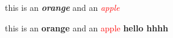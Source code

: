 \documentclass{article}
\newcommand\jh[1]{\textbf{\itshape #1}}
\newcommand\hs[1]{\textcolor{red}{\itshape #1}}
\begin{document}
this is an \jh{orange} and an \hs{apple}

this is an \textbf{orange} and an \textcolor{red}{apple}
\textbf{hello hhhh}
\end{document}
